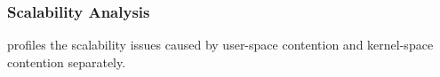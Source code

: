  
\subsubsection{Scalability Analysis} 

\MP{} profiles the scalability issues caused by user-space contention and kernel-space contention separately. 

